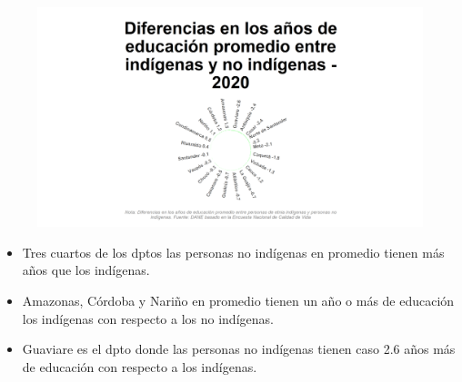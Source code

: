     \begin{figure}[H]
        \caption[Diferencia en los años de educación promedio entre indígenas y no indígenas por departamentos para 2020 ]{\label{difeducmin_dpto_static} }
        \begin{center}
        \includegraphics[width=\textwidth,keepaspectratio]{img/var_123_static.png}
        \end{center}
    \end{figure}
            \begin{itemize}
                \item Tres cuartos de los dptos las personas no indígenas en promedio tienen más años que los indígenas.
                \item Amazonas, Córdoba y Nariño en promedio tienen un año o más de educación los indígenas con respecto a los no indígenas.
                \item Guaviare es el dpto donde las personas no indígenas tienen caso 2.6 años más de educación con respecto a los indígenas.
                \end{itemize}


